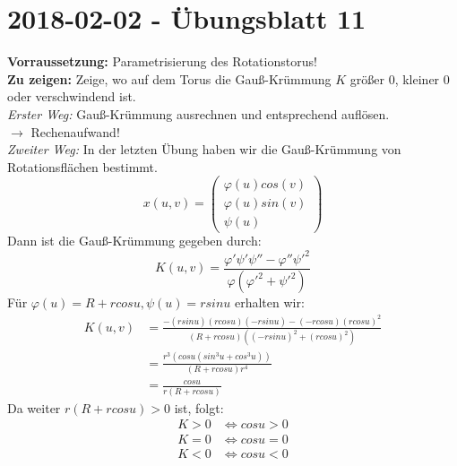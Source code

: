 \section{2018-02-02 - Übungsblatt 11} %
\label{sec:übungsblatt_11}
\begin{problem*}[1]
\textbf{Vorraussetzung:} Parametrisierung des Rotationstorus!\\
\textbf{Zu zeigen:} Zeige, wo auf dem Torus die Gauß-Krümmung $ K $ größer 0, kleiner 0 oder verschwindend ist.\\
\emph{Erster Weg:} Gauß-Krümmung ausrechnen und entsprechend auflösen.\\
$\rightarrow$ Rechenaufwand!\\
\emph{Zweiter Weg:} In der letzten Übung haben wir die Gauß-Krümmung von Rotationsflächen bestimmt.
\begin{equation*}
	x(u,v) = \begin{pmatrix}
	\varphi(u) cos(v) \\
	\varphi(u) sin(v) \\
	\psi(u)	
	\end{pmatrix}
\end{equation*}
Dann ist die Gauß-Krümmung gegeben durch: 
\begin{equation*}	
	K(u,v) = \frac{\varphi' \psi' \psi'' - \varphi'' \psi'^2}{\varphi(\varphi'^2 + \psi'^2)}
\end{equation*}
Für $\varphi(u) = R + rcosu, \psi(u) = r sinu$ erhalten wir:
\begin{align*}
K(u,v) &= \frac{-(rsinu)(rcosu)(-rsinu)-(-rcosu)(rcosu)^2}{(R+rcosu)((-rsinu)^2 + (rcosu)^2)} \\
&= \frac{r^3(cosu(sin^3u + cos^3 u))}{ (R + rcosu) r^4 } \\
&= \frac{cosu}{r(R+rcosu)} 
\end{align*}
Da weiter $r(R + rcosu) > 0$ ist, folgt: 
\begin{align*}
K > 0 &\Leftrightarrow cosu > 0 \\
K = 0 &\Leftrightarrow cosu = 0 \\
K < 0 &\Leftrightarrow cosu < 0
\end{align*}
\end{problem*}
